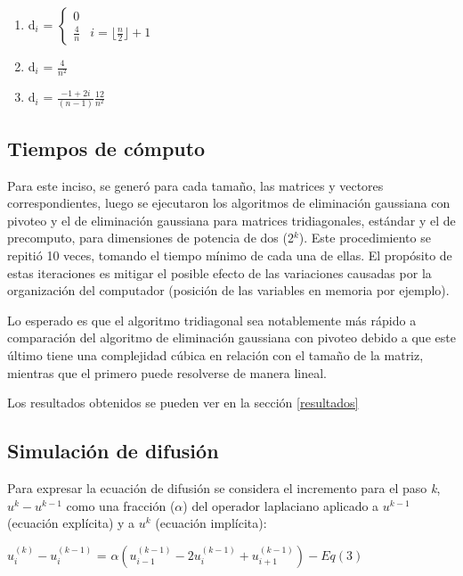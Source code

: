 \begin{enumerate}[label=\alph*)] %
\label{ec_ej4}
\item d$_{i}$ = 
    $\begin{cases}
      0\\
      \frac{4}{n} & i=\lfloor \frac{n}{2} \rfloor   +1
    \end{cases}$

\item d$_{i}$ = $\frac{4}{n^{2}}$

\item d$_{i}$ = $\frac{-1+2i}{(n-1)}\frac{12}{n^{2}}$

\end{enumerate}

\subsection{Tiempos de cómputo}
Para este inciso, se generó para cada tamaño, las matrices y vectores correspondientes, luego se ejecutaron los algoritmos de eliminación gaussiana con pivoteo y el de eliminación gaussiana para matrices tridiagonales, estándar y el de precomputo, para dimensiones de potencia de dos (2$^k$). Este procedimiento se repitió 10 veces, tomando el tiempo mínimo de cada una de ellas. El propósito de estas iteraciones es mitigar el posible efecto de las variaciones causadas por la organización del computador (posición de las variables en memoria por ejemplo).

Lo esperado es que el algoritmo tridiagonal sea notablemente más rápido a comparación del algoritmo de eliminación gaussiana con pivoteo debido a que este último tiene una complejidad cúbica en relación con el tamaño de la matriz, mientras que el primero puede resolverse de manera lineal.

Los resultados obtenidos se pueden ver en la sección \ref{resultados}


\subsection{Simulación de difusión}

Para expresar la ecuación de difusión se considera el incremento para el paso \textit{k}, $u^k - u^{k-1}$ como una
fracción ($\alpha$) del operador laplaciano aplicado a $u^{k-1}$ (ecuación explícita) y a $u^{k}$ (ecuación implícita):
\begin{center}
  $u_i^{(k)} - u_i^{(k-1)}$ = $\alpha(u_{i-1}^{(k-1)} - 2u_i^{(k-1)} + u_{i+1}^{(k-1)}) - Eq (3)$
\end{center}

